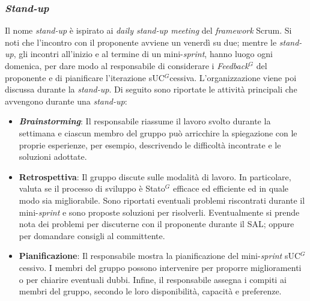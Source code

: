 \subsubsection{\textit{Stand-up}}
Il nome \textit{stand-up} è ispirato ai \textit{daily stand-up meeting} del
\textit{framework} Scrum. Si noti che l'incontro con il proponente avviene un
venerdì su due; mentre le \textit{stand-up}, gli incontri all'inizio
e al termine di un mini-\textit{sprint}, hanno luogo ogni domenica,
per dare modo al responsabile di considerare i \textit{\gls{Feedback}$^G$} del proponente
e di pianificare l'iterazione s\gls{UC}$^G$cessiva. L'organizzazione viene poi discussa
durante la \textit{stand-up}. Di seguito sono riportate le attività principali
che avvengono durante una \textit{stand-up}:

\begin{itemize}
	\item \textbf{\textit{Brainstorming}}: Il responsabile riassume il lavoro
	      svolto durante la settimana e ciascun membro del gruppo può arricchire
	      la spiegazione con le proprie esperienze, per esempio, descrivendo le
	      difficoltà incontrate e le soluzioni adottate.

	\item \textbf{Retrospettiva}: Il gruppo discute sulle modalità di
	      lavoro. In particolare, valuta se il processo di sviluppo è \gls{Stato}$^G$
	      efficace ed efficiente ed in quale modo sia migliorabile. Sono
	      riportati eventuali problemi riscontrati durante il
	      mini-\textit{sprint} e sono proposte soluzioni per risolverli.
	      Eventualmente si prende nota dei problemi per discuterne con il
	      proponente durante il SAL; oppure per domandare consigli al
	      committente.

	\item \textbf{Pianificazione}: Il responsabile mostra la pianificazione del
	      mini-\textit{sprint} s\gls{UC}$^G$cessivo. I membri del gruppo possono
	      intervenire per proporre miglioramenti o per chiarire eventuali dubbi.
	      Infine, il responsabile assegna i compiti ai membri del gruppo,
	      secondo le loro disponibilità, capacità e preferenze.
\end{itemize}

